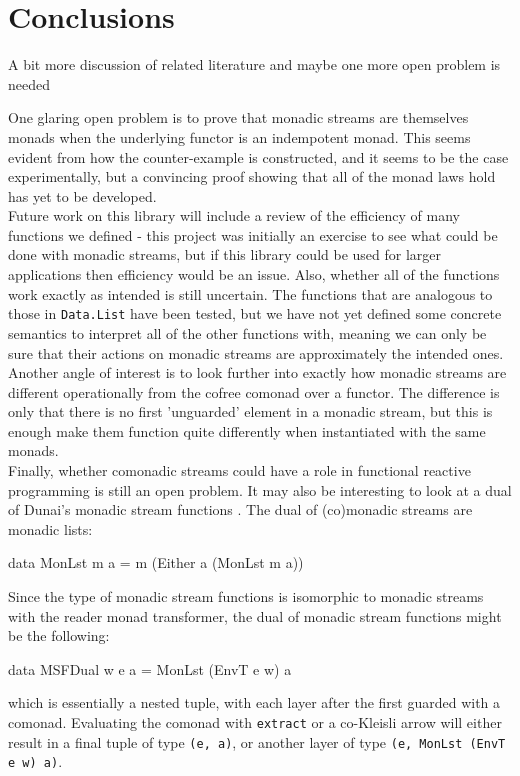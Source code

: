 \section{Conclusions}

\begin{ccomment} 
	A bit more discussion of related literature and maybe one more open problem is needed
\end{ccomment}



One glaring open problem is to prove that monadic streams are themselves monads when the underlying functor is an indempotent monad. This seems evident from how the counter-example is constructed, and it seems to be the case experimentally, but a convincing proof showing that all of the monad laws hold has yet to be developed. \\

Future work on this library will include a review of the efficiency of many functions we defined - this project was initially an exercise to see what could be done with monadic streams, but if this library could be used for larger applications then efficiency would be an issue. Also, whether all of the functions work exactly as intended is still uncertain. The functions that are analogous to those in \verb+Data.List+ have been tested, but we have not yet defined some concrete semantics to interpret all of the other functions with, meaning we can only be sure that their actions on monadic streams are approximately the intended ones. \\

Another angle of interest is to look further into exactly how monadic streams are different operationally from the cofree comonad over a functor. The difference is only that there is no first 'unguarded' element in a monadic stream, but this is enough make them function quite differently when instantiated with the same monads. \\

Finally, whether comonadic streams could have a role in functional reactive programming is still an open problem. It may also be interesting to look at a dual of Dunai's monadic stream functions \cite{dunai}. The dual of (co)monadic streams are monadic lists:
\begin{haskell}
data MonLst m a = m (Either a (MonLst m a)) 
\end{haskell}
Since the type of monadic stream functions is isomorphic to monadic streams with the reader monad transformer, the dual of monadic stream functions might be the following:
\begin{haskell}
data MSFDual w e a = MonLst (EnvT e w) a
\end{haskell}
which is essentially a nested tuple, with each layer after the first guarded with a comonad. Evaluating the comonad with \verb+extract+ or a co-Kleisli arrow will either result in a final tuple of type \verb+(e, a)+, or another layer of type \verb+(e, MonLst (EnvT e w) a)+. 

